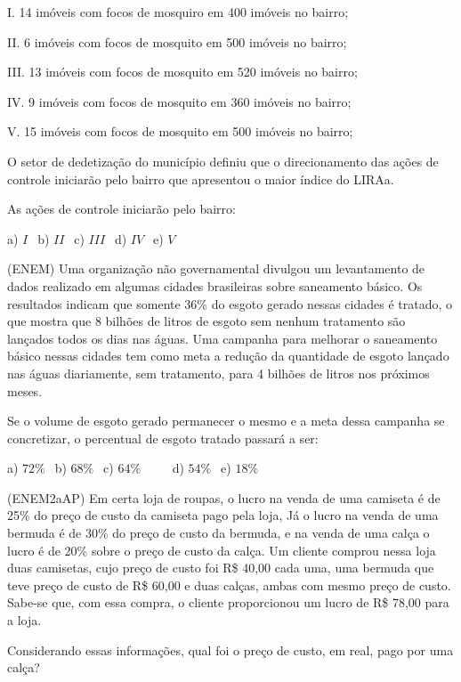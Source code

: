 \begin{multicols*}{2}
		      I. 14 imóveis com focos de mosquiro em 400 imóveis no bairro;

		      II. 6 imóveis com focos de mosquito em 500 imóveis no bairro;

		      III. 13 imóveis com focos de mosquito em 520 imóveis no bairro;

		      IV. 9 imóveis com focos de mosquito em 360 imóveis no bairro;

		      V. 15 imóveis com focos de mosquito em 500 imóveis no bairro;

		      O setor de dedetização do município definiu que o direcionamento das ações de controle iniciarão pelo bairro
		      que apresentou o maior índice do LIRAa.

		      As ações de controle iniciarão pelo bairro:

		      a) $ I \ \ $ b) $ II \ \ $ c) $III \ \ $ d) $ IV \ \ $ e) $ V \ \ $

		\execnum (ENEM) Uma organização não governamental divulgou um levantamento de dados realizado em algumas cidades
		      brasileiras sobre saneamento básico. Os resultados indicam que somente 36\% do esgoto gerado nessas cidades é tratado, o que mostra que 8 bilhões de litros de esgoto sem nenhum tratamento são lançados todos os dias nas águas. Uma campanha para melhorar o saneamento básico nessas cidades tem como meta a redução da quantidade de esgoto lançado nas águas diariamente, sem tratamento, para 4 bilhões de litros nos próximos meses.

		      Se o volume de esgoto gerado permanecer o mesmo e a meta dessa campanha se concretizar, o percentual de esgoto tratado passará a ser:

		      a) $72\% \ \ $ b) $68\% \ \ $ c) $64\% \ \ \ \ \ \ \ \ \ \ $ d) $54\% \ \ $ e) $18\% \ \ $

		\execnum (ENEM2aAP) Em certa loja de roupas, o lucro na venda de uma camiseta é de 25\% do preço de custo da camiseta pago pela loja, Já o lucro na venda de uma bermuda é de 30\% do preço de custo da bermuda, e na venda de uma calça o lucro é de 20\% sobre o preço de custo da calça. Um cliente comprou nessa loja duas camisetas, cujo preço de custo foi R\$ 40,00 cada uma, uma bermuda que teve preço de custo de R\$ 60,00 e duas calças, ambas com mesmo
		      preço de custo. Sabe-se que, com essa compra, o cliente proporcionou um lucro de R\$ 78,00 para a loja.

		      Considerando essas informações, qual foi o preço de custo, em real, pago por uma calça?


\end{multicols*}
